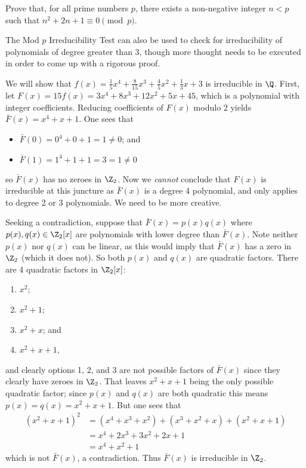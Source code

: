 \begin{exercise}
    Prove that, for all prime numbers $p$, there exists a non-negative integer $n < p$ such that $n^2 + 2n + 1 \equiv 0 \pmod{p}$.
\end{exercise}

The Mod $p$ Irreducibility Test can also be used to check for irreducibility of polynomials of degree greater than 3, though more thought needs to be executed in order to come up with a rigorous proof.

\begin{example}
    We will show that $f(x) = \frac15x^4 + \frac8{15}x^3 + \frac45x^2 + \frac13x + 3$ is irreducible in $\Q$. First, let $F(x) = 15f(x) = 3x^4 + 8x^3 + 12x^2 + 5x + 45$, which is a polynomial with integer coefficients. Reducing coefficients of $F(x)$ modulo 2 yields $\bar{F}(x) = x^4 + x + 1$. One sees that
    \begin{itemize}
        \item $\bar{F}(0) = 0^4 + 0 + 1 = 1 \neq 0$; and
        \item $\bar{F}(1) = 1^4 + 1 + 1 = 3 = 1 \neq 0$
    \end{itemize}
    so $\bar{F}(x)$ has no zeroes in $\Z_2$. Now we \textit{cannot} conclude that $F(x)$ is irreducible at this juncture as $\bar{F}(x)$ is a degree 4 polynomial, and  only applies to degree 2 or 3 polynomials. We need to be more creative.

    Seeking a contradiction, suppose that $\bar{F}(x) = p(x)q(x)$ where $p(x), q(x) \in \Z_2[x]$ are polynomials with lower degree than $\bar{F}(x)$. Note neither $p(x)$ nor $q(x)$ can be linear, as this would imply that $\bar{F}(x)$ has a zero in $\Z_2$ (which it does not). So both $p(x)$ and $q(x)$ are quadratic factors. There are 4 quadratic factors in $\Z_2[x]$:
    \begin{enumerate}
        \item $x^2$;
        \item $x^2 + 1$;
        \item $x^2 + x$; and
        \item $x^2 + x + 1$,
    \end{enumerate}
    and clearly options 1, 2, and 3 are not possible factors of $\bar{F}(x)$ since they clearly have zeroes in $\Z_2$. That leaves $x^2 + x + 1$ being the only possible quadratic factor; since $p(x)$ and $q(x)$ are both quadratic this means $p(x) = q(x) = x^2 + x + 1$. But one sees that
    \begin{align*}
        (x^2 + x + 1)^2 &= (x^4 + x^3 + x^2) + (x^3 + x^2 + x) + (x^2 + x + 1)\\
        &= x^4 + 2x^3 + 3x^2 + 2x + 1\\
        &= x^4 + x^2 + 1
    \end{align*}
    which is not $\bar{F}(x)$, a contradiction. Thus $\bar{F}(x)$ is irreducible in $\Z_2$.


\end{example}
